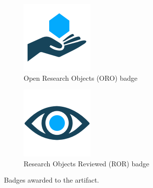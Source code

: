 \begin{figure}[htbp]
  \centering
  \begin{subfigure}{0.3\linewidth}
    \includegraphics[width=\linewidth]{kappa/img/Open_research.png}
    \caption{Open Research Objects (ORO) badge}
    \label{fig:ORO}
  \end{subfigure}\hspace{2cm}
  \begin{subfigure}{0.3\linewidth}
    \includegraphics[width=\linewidth]{kappa/img/Research_Objects.png}
    \caption{Research Objects Reviewed (ROR) badge}
    \label{fig:ROR}
  \end{subfigure}
  \caption{Badges awarded to the artifact.}
  \label{fig:badges}
\end{figure}



